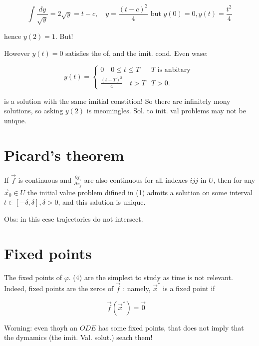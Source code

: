 $$ 
\int \frac{d y}{\sqrt{y}}=2 \sqrt{y}=t-c, \quad y=\frac{(t-c)^{2}}{4} \text { but } y(0)=0, y(t)=\frac{t^{2}}{4} 
$$ 

hence $y(2)=1$. But!

However $y(t)=0$ satisfies the of, and the imit. cond. Even wase:

$$ 
y(t)=\left\{\begin{array}{cc}
0 \quad 0 \leq t \leq T & T \text { is anbitary } \\
\frac{(t-T)^{2}}{4} \quad t>T & T>0 .
\end{array}\right. 
$$ 

is a solution with the same imitial constition! So there are infinitely mony solutions, so asking $y(2)$ is meomingles.
Sol. to init. val problems may not be unique.

\section*{Picard's theorem}
If $\vec{f}$ is continuous and $\frac{\partial f_{i}}{\partial x_{j}}$ are also continuous for all indexes $i j j$ in $U$, then for any $\vec{x}_{0} \in U$ the initial value problem difined in (1) admits a solution on some interval $t \in[-\delta, \delta], \delta>0$, and this salution is unique.

Obs: in this cese trajectories do not intersect.

\section*{Fixed points}
The fixed points of $\varphi$. (4) are the simplest to study as time is not relevant. Indeed, fixed points are the zeros of $\vec{f}$ : namely, $\vec{x}^{*}$ is a fixed point if


\begin{equation*}
\vec{f}\left(\vec{x}^{*}\right)=\overrightarrow{0} \quad \tag{3}
\end{equation*}


Worning: even thoyh an $O D E$ has some fixed points, that does not imply that the dymamics (the imit. Val. solut.) seach them!